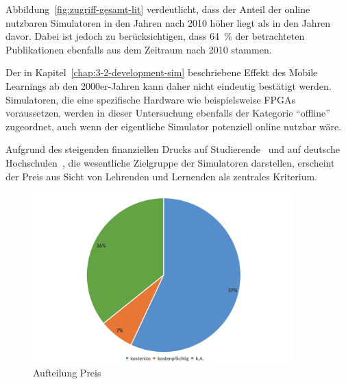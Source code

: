Abbildung~\ref{fig:zugriff-gesamt-lit} verdeutlicht, dass der Anteil der online nutzbaren Simulatoren in den Jahren nach 2010 höher liegt als in den Jahren davor. Dabei ist jedoch zu berücksichtigen, dass 64~\% der betrachteten Publikationen ebenfalls aus dem Zeitraum nach 2010 stammen.

Der in Kapitel~\ref{chap:3-2-development-sim} beschriebene Effekt des Mobile Learnings ab den 2000er-Jahren kann daher nicht eindeutig bestätigt werden. Simulatoren, die eine spezifische Hardware wie beispielsweise \acp{FPGA} voraussetzen, werden in dieser Untersuchung ebenfalls der Kategorie \enquote{offline} zugeordnet, auch wenn der eigentliche Simulator potenziell online nutzbar wäre.

Aufgrund des steigenden finanziellen Drucks auf Studierende~\parencite[S.~1]{meier_bedeutung_2023} und auf deutsche Hochschulen~\cite{von_stuckrad_hochschulfinanzierung_nodate}, die wesentliche Zielgruppe der Simulatoren darstellen, erscheint der Preis aus Sicht von Lehrenden und Lernenden als zentrales Kriterium.


\begin{figure}[!htbp]
    \centering
    \includegraphics[width=0.9\textwidth]{graphics_lit/14-preis.png}
    \caption{Aufteilung Preis}
    \label{fig:14-preis2}
\end{figure}

